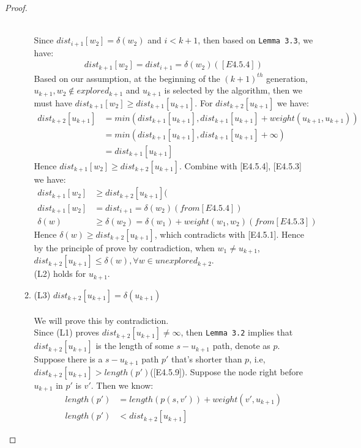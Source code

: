 \begin{proof}
\begin{itemize}
\begin{enumerate}
  \\
  Since $dist_{i+1}[w_2] = \delta(w_2)$ and $i < k+1$, then based on \texttt{Lemma 3.3}, we have:
  \begin{align*}
  dist_{k+1}[w_2] = dist_{i+1} = \delta(w_2) ([E4.5.4])
  \end{align*}
  Based on our assumption, at the beginning of the $(k+1)^{th}$ generation, $u_{k+1}, w_2 \notin explored_{k+1}$ and $u_{k+1}$ is selected by the algorithm, then we must have $dist_{k+1}[w_2] \geq dist_{k+1}[u_{k+1}]$. For $dist_{k+2}[u_{k+1}]$ we have: 
  \begin{align*}
  dist_{k+2}[u_{k+1}] &= min(dist_{k+1}[u_{k+1}], dist_{k+1}[u_{k+1}] + weight(u_{k+1}, u_{k+1})) \\
                      &= min(dist_{k+1}[u_{k+1}], dist_{k+1}[u_{k+1}] + \infty) \\
                      &= dist_{k+1}[u_{k+1}] 
  \end{align*}
  Hence $dist_{k+1}[w_2] \geq dist_{k+2}[u_{k+1}]$. Combine with [E4.5.4], [E4.5.3] we have: 
  \begin{align*}
    dist_{k+1}[w_2] &\geq dist_{k+2}[u_{k+1}] (\\
    dist_{k+1}[w_2] &= dist_{i+1} = \delta(w_2) (from [E4.5.4]) \\
    \delta(w) &\geq \delta(w_2) = \delta(w_1) + weight(w_1, w_2)(from [E4.5.3])
  \end{align*}
  Hence $\delta(w) \geq dist_{k+2}[u_{k+1}]$, which contradicts with [E4.5.1]. Hence by the principle of prove by contradiction, when $w_1 \neq u_{k+1}$, $dist_{k+2}[u_{k+1}] \leq \delta(w), \forall w \in unexplored_{k+2}$. 
  \\
  (L2) holds for $u_{k+1}$. 
  \\
  \item (L3) $dist_{k+2}[u_{k+1}] = \delta(u_{k+1})$
  \\\\
  We will prove this by contradiction. 
  \\
  Since (L1) proves $dist_{k+2}[u_{k+1}] \neq \infty$, then \texttt{Lemma 3.2} implies that $dist_{k+2}[u_{k+1}]$ is the length of some $s-u_{k+1}$ path, denote as $p$. Suppose there is a $s-u_{k+1}$ path $p'$ that's shorter than $p$, i.e, $dist_{k+2}[u_{k+1}] > length(p')$([E4.5.9]). Suppose the node right before $u_{k+1}$ in $p'$ is $v'$. Then we know: 
  \begin{align*}
  length(p') &= length(p(s, v')) + weight(v', u_{k+1}) \\
  length(p') &< dist_{k+2}[u_{k+1}]

\end{align*}
\end{enumerate}
\end{itemize}
\end{proof}
